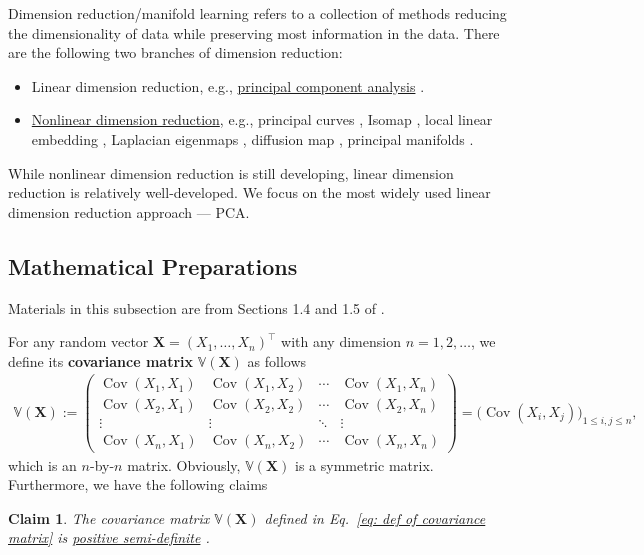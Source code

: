 \documentclass[11pt,letterpaper, leqno]{article}
\newtheorem{claim}[theorem]{Claim}
\numberwithin{equation}{section}
\numberwithin{theorem}{section}
\numberwithin{lemma}{section}
\numberwithin{corollary}{section}
\numberwithin{definition}{section}
\numberwithin{proposition}{section}
\numberwithin{remark}{section}
\numberwithin{example}{section}
\newcommand{\T}{\intercal}
\begin{document}
Dimension reduction/manifold learning refers to a collection of methods reducing the dimensionality of data while preserving most information in the data. There are the following two branches of dimension reduction:
\begin{itemize}
    \item Linear dimension reduction, e.g., \href{https://en.wikipedia.org/wiki/Principal_component_analysis}{principal component analysis} \citep[PCA,][]{pearson1901liii}.

    \item \href{https://en.wikipedia.org/wiki/Nonlinear_dimensionality_reduction}{Nonlinear dimension reduction}, e.g., principal curves \citep{hastie1989principal}, Isomap \citep{tenenbaum2000global}, local linear embedding \citep{roweis2000nonlinear, wu2018think}, Laplacian eigenmaps \citep{belkin2001laplacian}, diffusion map \citep{coifman2005geometric, coifman2006diffusion}, principal manifolds \citep{smola2001regularized, meng2021principal}.
\end{itemize}
While nonlinear dimension reduction is still developing, linear dimension reduction is relatively well-developed. We focus on the most widely used linear dimension reduction approach --- PCA.


\subsection{Mathematical Preparations}

Materials in this subsection are from Sections 1.4 and 1.5 of \cite{seber2012linear}.

For any random vector $\boldsymbol{X}=(X_1,\ldots,X_n)^\T$ with any dimension $n=1,2,\ldots$, we define its \textbf{covariance matrix} $\mathbb{V}(\boldsymbol{X})$ as follows \citep[][Definition 1.3]{seber2012linear}
\begin{align}\label{eq: def of covariance matrix}
    \mathbb{V}(\boldsymbol{X}):=
    \begin{pmatrix}
        \operatorname{Cov}(X_1,X_1) & \operatorname{Cov}(X_1,X_2) & \cdots & \operatorname{Cov}(X_1,X_n) \\
        \operatorname{Cov}(X_2,X_1) & \operatorname{Cov}(X_2,X_2) & \cdots & \operatorname{Cov}(X_2,X_n) \\
        \vdots & \vdots & \ddots & \vdots \\
        \operatorname{Cov}(X_n,X_1) & \operatorname{Cov}(X_n,X_2) & \cdots & \operatorname{Cov}(X_n,X_n)
    \end{pmatrix}
    =\Big(\operatorname{Cov}(X_i,X_j)\Big)_{1\le i,j\le n},
\end{align}
which is an $n$-by-$n$ matrix. Obviously, $\mathbb{V}(\boldsymbol{X})$ is a symmetric matrix. Furthermore, we have the following claims
\begin{claim}\label{claim: positive semi-definite}
    The covariance matrix $\mathbb{V}(\boldsymbol{X})$ defined in Eq.~\eqref{eq: def of covariance matrix} is \href{https://en.wikipedia.org/wiki/Definite_matrix}{positive semi-definite} .
\end{claim}
\end{document}
